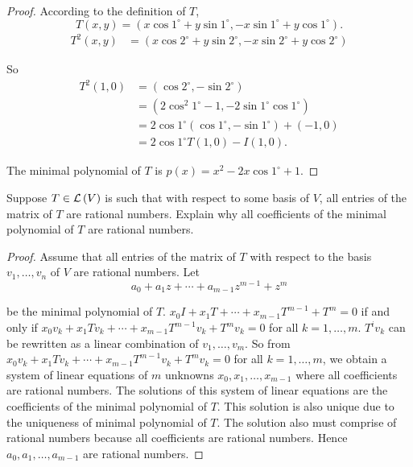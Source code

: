 \begin{proof}
    According to the definition of $T$,
    \[
        T(x, y) = (x\cos 1^{\circ} + y \sin 1^{\circ}, -x\sin 1^{\circ} + y\cos 1^{\circ}).
    \]
    \begin{align*}
        T^{2}(x, y) & = (x\cos 2^{\circ} + y\sin 2^{\circ}, -x\sin 2^{\circ} + y\cos 2^{\circ})
    \end{align*}

    So
    \begin{align*}
        T^{2}(1, 0) & = (\cos 2^{\circ}, -\sin 2^{\circ})                          \\
                    & = (2\cos^{2} 1^{\circ} - 1, -2\sin 1^{\circ}\cos 1^{\circ})  \\
                    & = 2\cos 1^{\circ}(\cos 1^{\circ}, -\sin 1^{\circ}) + (-1, 0) \\
                    & = 2\cos 1^{\circ} T(1, 0) - I(1, 0).
    \end{align*}

    The minimal polynomial of $T$ is $p(x) = x^{2} - 2x\cos 1^{\circ} + 1$.
\end{proof}
\newpage

\begin{exercise}
    Suppose $T\in\mathcal{L}\left({V}\right)$ is such that with respect to some basis of $V$, all entries of the matrix of $T$ are rational numbers. Explain why all coefficients of the minimal polynomial of $T$ are rational numbers.
\end{exercise}

\begin{proof}
    Assume that all entries of the matrix of $T$ with respect to the basis $v_{1}, \ldots, v_{n}$ of $V$ are rational numbers. Let
    \[
        a_{0} + a_{1}z + \cdots + a_{m-1}z^{m-1} + z^{m}
    \]

    be the minimal polynomial of $T$. $x_{0}I + x_{1}T + \cdots + x_{m-1}T^{m-1} + T^{m} = 0$ if and only if $x_{0}v_{k} + x_{1}Tv_{k} + \cdots + x_{m-1}T^{m-1}v_{k} + T^{m}v_{k} = 0$ for all $k = 1,\ldots, m$. $T^{i}v_{k}$ can be rewritten as a linear combination of $v_{1}, \ldots, v_{m}$. So from  $x_{0}v_{k} + x_{1}Tv_{k} + \cdots + x_{m-1}T^{m-1}v_{k} + T^{m}v_{k} = 0$ for all $k = 1,\ldots, m$, we obtain a system of linear equations of $m$ unknowns $x_{0}, x_{1}, \ldots, x_{m-1}$ where all coefficients are rational numbers. The solutions of this system of linear equations are the coefficients of the minimal polynomial of $T$. This solution is also unique due to the uniqueness of minimal polynomial of $T$. The solution also must comprise of rational numbers because all coefficients are rational numbers. Hence $a_{0}, a_{1}, \ldots, a_{m-1}$ are rational numbers.
\end{proof}
\newpage

